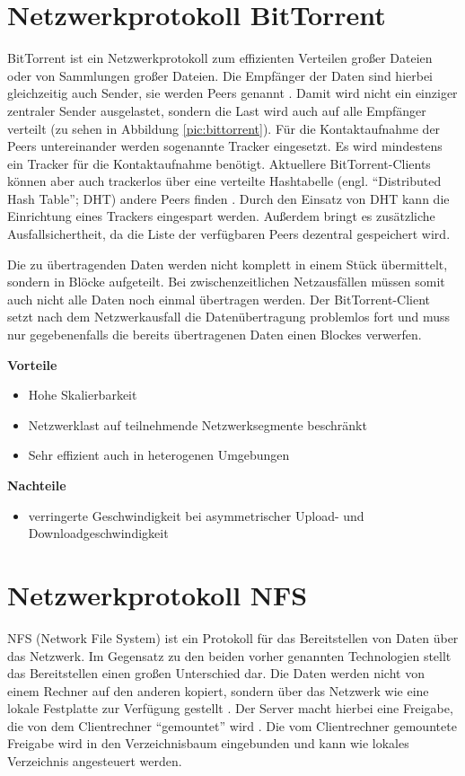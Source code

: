 \section{Netzwerkprotokoll BitTorrent}
BitTorrent ist ein Netzwerkprotokoll zum effizienten Verteilen großer Dateien oder von Sammlungen großer Dateien. Die Empfänger der Daten sind hierbei gleichzeitig auch Sender, sie werden Peers genannt \cite{btspec}. Damit wird nicht ein einziger zentraler Sender ausgelastet, sondern die Last wird auch auf alle Empfänger verteilt (zu sehen in Abbildung \ref{pic:bittorrent}). Für die Kontaktaufnahme der Peers untereinander werden sogenannte Tracker eingesetzt. Es wird mindestens ein Tracker für die Kontaktaufnahme benötigt. Aktuellere BitTorrent-Clients können aber auch trackerlos über eine verteilte Hashtabelle (engl. ``Distributed Hash Table''; DHT) andere Peers finden \cite{dhtspec}. Durch den Einsatz von DHT kann die Einrichtung eines Trackers eingespart werden. Außerdem bringt es zusätzliche Ausfallsichertheit, da die Liste der verfügbaren Peers dezentral gespeichert wird. 


Die zu übertragenden Daten werden nicht komplett in einem Stück übermittelt, sondern in Blöcke aufgeteilt. Bei zwischenzeitlichen Netzausfällen müssen somit auch nicht alle Daten noch einmal übertragen werden. Der BitTorrent-Client setzt nach dem Netzwerkausfall die Datenübertragung problemlos fort und muss nur gegebenenfalls die bereits übertragenen Daten einen Blockes verwerfen.

\textbf{Vorteile}
\begin{itemize}
 \item Hohe Skalierbarkeit
 \item Netzwerklast auf teilnehmende Netzwerksegmente beschränkt
 \item Sehr effizient auch in heterogenen Umgebungen
\end{itemize}

\textbf{Nachteile}
\begin{itemize}
  \item verringerte Geschwindigkeit bei asymmetrischer Upload- und Downloadgeschwindigkeit
\end{itemize}

\section{Netzwerkprotokoll NFS}
NFS (Network File System) ist ein Protokoll für das Bereitstellen von Daten über das Netzwerk. Im Gegensatz zu den beiden vorher genannten Technologien stellt das Bereitstellen einen großen Unterschied dar. Die Daten werden nicht von einem Rechner auf den anderen kopiert, sondern über das Netzwerk wie eine lokale Festplatte zur Verfügung gestellt \cite{Nfsspec}. Der Server macht hierbei eine Freigabe, die von dem Clientrechner ``gemountet'' wird \cite{nfslinux}. Die vom Clientrechner gemountete Freigabe wird in den Verzeichnisbaum eingebunden und kann wie lokales Verzeichnis angesteuert werden.

